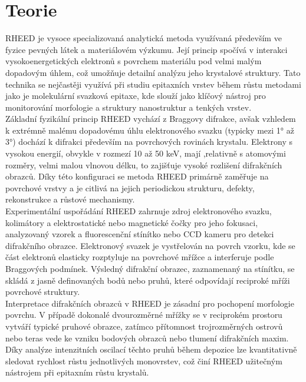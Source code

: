 \documentclass{article}
\begin{document}
\newpage

\section{Teorie}
RHEED je vysoce specializovaná analytická metoda využívaná především ve fyzice pevných látek a materiálovém výzkumu. Její princip spočívá v interakci vysokoenergetických elektronů s povrchem materiálu pod velmi malým dopadovým úhlem, což umožňuje detailní analýzu jeho krystalové struktury. Tato technika se nejčastěji využívá při studiu epitaxních vrstev během růstu metodami jako je molekulární svazková epitaxe, kde slouží jako klíčový nástroj pro monitorování morfologie a struktury nanostruktur a tenkých vrstev.\\

Základní fyzikální princip RHEED vychází z Braggovy difrakce, avšak vzhledem k extrémně malému dopadovému úhlu elektronového svazku (typicky mezi 1° až 3°) dochází k difrakci především na povrchových rovinách krystalu. Elektrony s vysokou energií, obvykle v rozmezí 10 až 50 keV, mají ,relativně s atomovými rozměry, velmi malou vlnovou délku, to zajišťuje vysoké rozlišení difrakčních obrazců. Díky této konfiguraci se metoda RHEED primárně zaměřuje na povrchové vrstvy a je citlivá na jejich periodickou strukturu, defekty, rekonstrukce a růstové mechanismy.\\

Experimentální uspořádání RHEED zahrnuje zdroj elektronového svazku, kolimátory a elektrostatické nebo magnetické čočky pro jeho fokusaci, analyzovaný vzorek a fluorescenční stínítko nebo CCD kameru pro detekci difrakčního obrazce. Elektronový svazek je vystřelován na povrch vzorku, kde se část elektronů elasticky rozptyluje na povrchové mřížce a interferuje podle Braggových podmínek. Výsledný difrakční obrazec, zaznamenaný na stínítku, se skládá z jasně definovaných bodů nebo pruhů, které odpovídají reciproké mříži povrchové struktury.\\

Interpretace difrakčních obrazců v RHEED je zásadní pro pochopení morfologie povrchu. V případě dokonalé dvourozměrné mřížky se v reciprokém prostoru vytváří typické pruhové obrazce, zatímco přítomnost trojrozměrných ostrovů nebo teras vede ke vzniku bodových obrazců nebo tlumení difrakčních maxim. Díky analýze intenzitních oscilací těchto pruhů během depozice lze kvantitativně sledovat rychlost růstu jednotlivých monovrstev, což činí RHEED užitečným nástrojem při epitaxním růstu krystalů.\\
\end{document}
